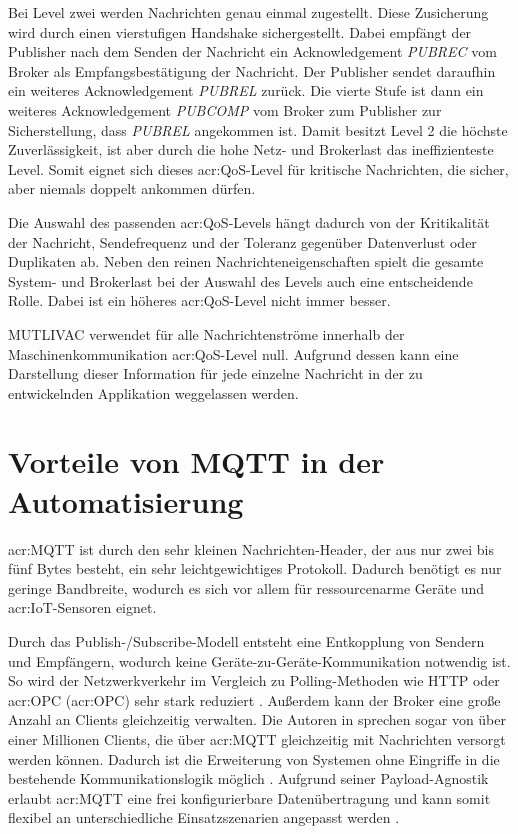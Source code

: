         Bei Level zwei werden Nachrichten genau einmal zugestellt. Diese Zusicherung wird durch einen vierstufigen Handshake sichergestellt. Dabei empfängt der Publisher nach dem Senden der Nachricht ein Acknowledgement \textit{PUBREC} vom Broker als Empfangsbestätigung der Nachricht. Der Publisher sendet daraufhin ein weiteres Acknowledgement \textit{PUBREL} zurück. 
        Die vierte Stufe ist dann ein weiteres Acknowledgement \textit{PUBCOMP} vom Broker zum Publisher zur Sicherstellung, dass \textit{PUBREL} angekommen ist. 
        Damit besitzt Level 2 die höchste Zuverlässigkeit, ist aber durch die hohe Netz- und Brokerlast das ineffizienteste Level. 
        Somit eignet sich dieses \acrshort{acr:QoS}-Level für kritische Nachrichten, die sicher, aber niemals doppelt ankommen dürfen. \autocite[23--24]{hivemqMQTTMQTT5} 

        Die Auswahl des passenden \acrshort{acr:QoS}-Levels hängt dadurch von der Kritikalität der Nachricht, Sendefrequenz und der Toleranz gegenüber Datenverlust oder Duplikaten ab. 
        Neben den reinen Nachrichteneigenschaften spielt die gesamte System- und Brokerlast bei der Auswahl des Levels auch eine entscheidende Rolle. 
        Dabei ist ein höheres \acrshort{acr:QoS}-Level nicht immer besser. \autocite[25]{hivemqMQTTMQTT5}

        MUTLIVAC verwendet für alle Nachrichtenströme innerhalb der Maschinenkommunikation \acrshort{acr:QoS}-Level null. Aufgrund dessen kann eine Darstellung dieser Information für jede einzelne Nachricht in der zu entwickelnden Applikation weggelassen werden.

\section{Vorteile von MQTT in der Automatisierung}
        \acrshort{acr:MQTT} ist durch den sehr kleinen Nachrichten-Header, der aus nur zwei bis fünf Bytes besteht, ein sehr leichtgewichtiges Protokoll. Dadurch benötigt es nur geringe Bandbreite, wodurch es sich vor allem für ressourcenarme Geräte und \acrshort{acr:IoT}-Sensoren eignet. \autocite[68--69]{IoTMQTT}

        Durch das Publish-/Subscribe-Modell entsteht eine Entkopplung von Sendern und Empfängern, wodurch keine Geräte-zu-Geräte-Kommunikation notwendig ist. 
        So wird der Netzwerkverkehr im Vergleich zu Polling-Methoden wie HTTP oder \acrshort{acr:OPC} (\acrlong{acr:OPC}) sehr stark reduziert \autocite[31--32]{KommunikationskonzepteIoT}. Außerdem kann der Broker 
        eine große Anzahl an Clients gleichzeitig verwalten. Die Autoren in\autocite[4]{MQTTEssentials} sprechen sogar von über einer Millionen Clients, die über \gls{acr:MQTT} gleichzeitig mit Nachrichten versorgt werden können. Dadurch ist die Erweiterung von Systemen ohne Eingriffe in die bestehende Kommunikationslogik
        möglich \autocite[11]{hivemqMQTTMQTT5}. Aufgrund seiner Payload-Agnostik erlaubt \acrshort{acr:MQTT} eine frei konfigurierbare Datenübertragung und kann somit flexibel an
        unterschiedliche Einsatzszenarien angepasst werden \autocite[69]{IoTMQTT}.

